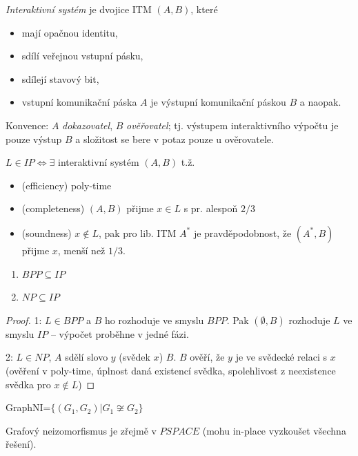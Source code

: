 \begin{defn}\label{def:is}
	\textit{Interaktivní systém} je dvojice ITM $(A,B)$, které
	\begin{itemize}
		\item mají opačnou identitu,
		\item sdílí veřejnou vstupní pásku,
		\item sdílejí stavový bit,
		\item vstupní komunikační páska $A$ je výstupní komunikační páskou $B$ a naopak.
	\end{itemize}
	Konvence: $A$ \textit{dokazovatel}, $B$ \textit{ověřovatel}; tj. výstupem interaktivního výpočtu je pouze výstup $B$ a složitost se bere v potaz pouze u ověrovatele.
\end{defn}

\begin{defn}[IP]
	$L \in IP \Leftrightarrow \exists$ interaktivní systém $(A,B)$ t.ž.
	\begin{itemize}
		\item (efficiency) poly-time
		\item (completeness) $(A,B)$ přijme $x\in L$ s pr. alespoň $2/3$
		\item (soundness) $x\not\in L$, pak pro lib. ITM $A^*$ je pravděpodobnost, že $(A^*,B)$ přijme $x$, menší než $1/3$.
	\end{itemize}
\end{defn}

\begin{thm}
	\begin{enumerate}
		\item $BPP \subseteq IP$
		\item $NP \subseteq IP$
	\end{enumerate}
	\begin{proof}
		1: $L\in BPP$ a $B$ ho rozhoduje ve smyslu $BPP$. Pak $(\emptyset,B)$ rozhoduje $L$ ve smyslu $IP$ -- výpočet proběhne v jedné fázi.

		2: $L\in NP$, $A$ sdělí slovo $y$ (svědek $x$) $B$. $B$ ověří, že $y$ je ve svědecké relaci s $x$ (ověření v poly-time, úplnost daná existencí svědka, spolehlivost z neexistence svědka pro $x\not\in L$)
	\end{proof}
\end{thm}
\pagebreak
\begin{defn}
	GraphNI=$\{(G_1,G_2)|G_1\not\cong G_2\}$
\end{defn}

Grafový neizomorfismus je zřejmě v $PSPACE$ (mohu in-place vyzkoušet všechna řešení).

